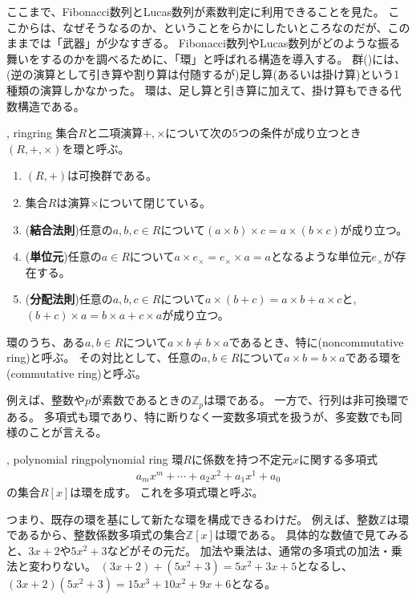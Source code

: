 ここまで、Fibonacci数列とLucas数列が素数判定に利用できることを見た。
ここからは、なぜそうなるのか、ということをらかにしたいところなのだが、このままでは「武器」が少なすぎる。
Fibonacci数列やLucas数列がどのような振る舞いをするのかを調べるために、「環」と呼ばれる構造を導入する。
群()には、(逆の演算として引き算や割り算は付随するが)足し算(あるいは掛け算)という1種類の演算しかなかった。
環は、足し算と引き算に加えて、掛け算もできる代数構造である。

\begin{Defi}{, ring}{ring}
集合$R$と二項演算$+,\times$について次の5つの条件が成り立つとき$(R,+,\times)$を環と呼ぶ。
\begin{enumerate}
 \item $(R,+)$は可換群である。
 \item 集合$R$は演算$\times$について閉じている。
 \item (\textbf{結合法則})任意の$a,b,c{\in}R$について$(a{\times}b){\times}c=a{\times}(b{\times}c)$が成り立つ。
 \item (\textbf{単位元})任意の$a{\in}R$について$a{\times}e_{\times}=e_{\times}{\times}a=a$となるような単位元$e_{\times}$が存在する。
 \item (\textbf{分配法則})任意の$a,b,c{\in}R$について$a{\times}(b{+}c)=a{\times}b{+}a{\times}c$と, $(b+c)\times{a}=b\times{a}+c\times{a}$が成り立つ。
\end{enumerate}
\end{Defi}

環のうち、ある$a,b{\in}R$について$a \times b \neq b \times a$であるとき、特に(noncommutative ring)と呼ぶ。
その対比として、任意の$a,b{\in}R$について$a \times b = b \times a$である環を(commutative ring)と呼ぶ。

例えば、整数や$p$が素数であるときの$\mathbb{Z}_p$は環である。
一方で、行列は非可換環である。
多項式も環であり、特に断りなく一変数多項式を扱うが、多変数でも同様のことが言える。

\begin{Defi}{, polynomial ring}{polynomial ring}
環$R$に係数を持つ不定元$x$に関する多項式
\begin{align*}
a_mx^m + \cdots + a_2x^2 + a_1x^1 + a_0
\end{align*}
の集合$R[x]$は環を成す。
これを多項式環と呼ぶ。
\end{Defi}

つまり、既存の環を基にして新たな環を構成できるわけだ。
例えば、整数$\mathbb{Z}$は環であるから、整数係数多項式の集合$\mathbb{Z}[x]$は環である。
具体的な数値で見てみると、$3x+2$や$5x^2+3$などがその元だ。
加法や乗法は、通常の多項式の加法・乗法と変わりない。
$(3x+2)+(5x^2+3)=5x^2+3x+5$となるし、$(3x+2)(5x^2+3)=15x^3+10x^2+9x+6$となる。


